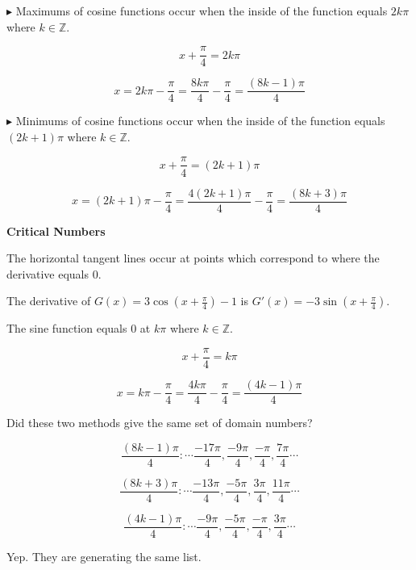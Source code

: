 \documentclass{ximera}
\begin{document}
\begin{example}
$\blacktriangleright$ Maximums of cosine functions occur when the inside of the function equals $2 k \pi$ where $k \in \mathbb{Z}$.


\[
x + \frac{\pi}{4} = 2 k \pi
\]

\[
x = 2 k \pi - \frac{\pi}{4} = \frac{8 k \pi}{4} - \frac{\pi}{4} = \frac{(8k - 1)\pi}{4}
\]




$\blacktriangleright$ Minimums of cosine functions occur when the inside of the function equals $(2 k + 1) \pi$ where $k \in \mathbb{Z}$.


\[
x + \frac{\pi}{4} = (2 k + 1) \pi
\]

\[
x = (2 k + 1) \pi - \frac{\pi}{4} = \frac{4(2 k + 1) \pi}{4} - \frac{\pi}{4} = \frac{(8k + 3)\pi}{4}
\]










\textbf{\textcolor{blue!55!black}{Critical Numbers}} 


The horizontal tangent lines occur at points which correspond to where the derivative equals $0$.  






The derivative of $G(x) = 3 \cos\left( x + \frac{\pi}{4} \right) - 1$ is $G'(x) = -3 \sin\left( x + \frac{\pi}{4} \right)$.


The sine function equals $0$ at $k \pi$ where $k \in \mathbb{Z}$.



\[
x + \frac{\pi}{4} =  k \pi
\]


\[
x  =    k \pi - \frac{\pi}{4} =  \frac{4 k \pi}{4} - \frac{\pi}{4} = \frac{(4k - 1)\pi}{4}
\]













Did these two methods give the same set of domain numbers? 



\[
\frac{(8k - 1)\pi}{4} :  \cdots \frac{-17\pi}{4}, \frac{-9\pi}{4}, \frac{-\pi}{4}, \frac{7\pi}{4} \cdots
\]

\[
\frac{(8k + 3)\pi}{4} :  \cdots \frac{-13\pi}{4}, \frac{-5\pi}{4}, \frac{3\pi}{4}, \frac{11\pi}{4} \cdots
\]


\[
\frac{(4k - 1)\pi}{4} :  \cdots \frac{-9\pi}{4}, \frac{-5\pi}{4}, \frac{-\pi}{4}, \frac{3\pi}{4} \cdots
\]



Yep.  They are generating the same list.


\end{example}
\end{document}
